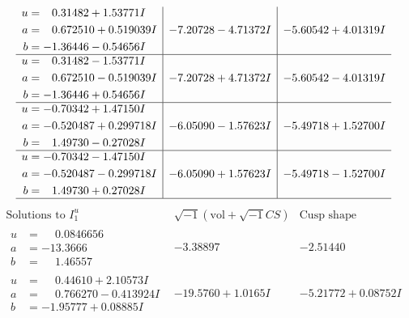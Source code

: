 \documentclass[1p]{elsarticle_modified}
\theoremstyle{definition}
\newcommand{\I}{\sqrt{-1}}
\begin{document}
$$\begin{array}{c|c|c}
\begin{aligned}
u &= \phantom{-}0.31482 + 1.53771 I \\
a &= \phantom{-}0.672510 + 0.519039 I \\
b &= -1.36446 - 0.54656 I\end{aligned}
 & -7.20728 - 4.71372 I & -5.60542 + 4.01319 I \\ \hline\begin{aligned}
u &= \phantom{-}0.31482 - 1.53771 I \\
a &= \phantom{-}0.672510 - 0.519039 I \\
b &= -1.36446 + 0.54656 I\end{aligned}
 & -7.20728 + 4.71372 I & -5.60542 - 4.01319 I \\ \hline\begin{aligned}
u &= -0.70342 + 1.47150 I \\
a &= -0.520487 + 0.299718 I \\
b &= \phantom{-}1.49730 - 0.27028 I\end{aligned}
 & -6.05090 - 1.57623 I & -5.49718 + 1.52700 I \\ \hline\begin{aligned}
u &= -0.70342 - 1.47150 I \\
a &= -0.520487 - 0.299718 I \\
b &= \phantom{-}1.49730 + 0.27028 I\end{aligned}
 & -6.05090 + 1.57623 I & -5.49718 - 1.52700 I\\
 \hline 
 \end{array}$$\newpage$$\begin{array}{c|c|c}  
\text{Solutions to }I^u_{1}& \I (\text{vol} + \sqrt{-1}CS) & \text{Cusp shape}\\
 \hline 
\begin{aligned}
u &= \phantom{-}0.0846656\phantom{ +0.000000I} \\
a &= -13.3666\phantom{ +0.000000I} \\
b &= \phantom{-}1.46557\phantom{ +0.000000I}\end{aligned}
 & -3.38897\phantom{ +0.000000I} & -2.51440\phantom{ +0.000000I} \\ \hline\begin{aligned}
u &= \phantom{-}0.44610 + 2.10573 I \\
a &= \phantom{-}0.766270 - 0.413924 I \\
b &= -1.95777 + 0.08885 I\end{aligned}
 & -19.5760 + 1.0165 I & -5.21772 + 0.08752 I \\ \hline\begin{aligned}

\end{aligned}
\end{array}$$
\end{document}
